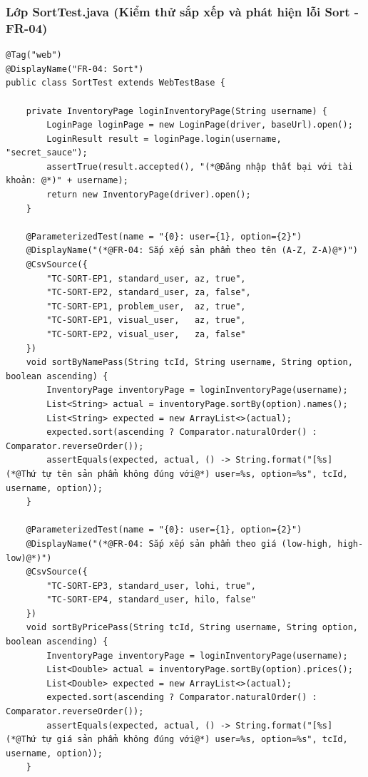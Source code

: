 \documentclass[a4paper]{article}
\begin{document}
\subsubsection{Lớp SortTest.java (Kiểm thử sắp xếp và phát hiện lỗi Sort - FR-04)}
\begin{lstlisting}[caption={Trích đoạn mã nguồn lớp SortTest.java}]
@Tag("web")
@DisplayName("FR-04: Sort")
public class SortTest extends WebTestBase {

    private InventoryPage loginInventoryPage(String username) {
        LoginPage loginPage = new LoginPage(driver, baseUrl).open();
        LoginResult result = loginPage.login(username, "secret_sauce");
        assertTrue(result.accepted(), "(*@Đăng nhập thất bại với tài khoản: @*)" + username);
        return new InventoryPage(driver).open();
    }

    @ParameterizedTest(name = "{0}: user={1}, option={2}")
    @DisplayName("(*@FR-04: Sắp xếp sản phẩm theo tên (A-Z, Z-A)@*)")
    @CsvSource({
        "TC-SORT-EP1, standard_user, az, true",
        "TC-SORT-EP2, standard_user, za, false",
        "TC-SORT-EP1, problem_user,  az, true",
        "TC-SORT-EP1, visual_user,   az, true",
        "TC-SORT-EP2, visual_user,   za, false"
    })
    void sortByNamePass(String tcId, String username, String option, boolean ascending) {
        InventoryPage inventoryPage = loginInventoryPage(username);
        List<String> actual = inventoryPage.sortBy(option).names();
        List<String> expected = new ArrayList<>(actual);
        expected.sort(ascending ? Comparator.naturalOrder() : Comparator.reverseOrder());
        assertEquals(expected, actual, () -> String.format("[%s] (*@Thứ tự tên sản phẩm không đúng với@*) user=%s, option=%s", tcId, username, option));
    }

    @ParameterizedTest(name = "{0}: user={1}, option={2}")
    @DisplayName("(*@FR-04: Sắp xếp sản phẩm theo giá (low-high, high-low)@*)")
    @CsvSource({
        "TC-SORT-EP3, standard_user, lohi, true",
        "TC-SORT-EP4, standard_user, hilo, false"
    })
    void sortByPricePass(String tcId, String username, String option, boolean ascending) {
        InventoryPage inventoryPage = loginInventoryPage(username);
        List<Double> actual = inventoryPage.sortBy(option).prices();
        List<Double> expected = new ArrayList<>(actual);
        expected.sort(ascending ? Comparator.naturalOrder() : Comparator.reverseOrder());
        assertEquals(expected, actual, () -> String.format("[%s] (*@Thứ tự giá sản phẩm không đúng với@*) user=%s, option=%s", tcId, username, option));
    }


\end{lstlisting}
\end{document}

